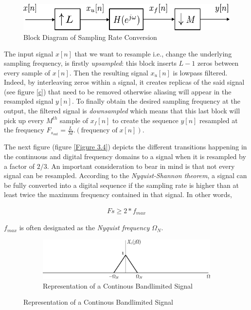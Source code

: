 \begin{figure}[th]
	\centering
	\includegraphics[scale = 0.8]{resampler.pdf}
	\caption{Block Diagram of Sampling Rate Conversion}\label{Figure 3.3}
\end{figure}

The input signal $x[n]$ that we want to resample i.e., change the underlying sampling frequency, is firstly \textit{upsampled}: this block inserts $L-1$ zeros between every sample of $x[n]$. Then the resulting signal $x_u[n]$ is lowpass filtered. Indeed, by interleaving zeros within a signal, it creates replicas of the said signal (see figure \ref{c}) that need to be removed otherwise aliasing will appear in the resampled signal $y[n]$. To finally obtain the desired sampling frequency at the output, the filtered signal is \textit{downsampled} which means that this last block will pick up every $M^{th}$ sample of $x_f[n]$  to create the sequence $y[n]$ resampled at the frequency $F_{s_{out}} = \frac{L}{M}.(\text{frequency of}\; x[n])$.

The next figure (figure \ref{Figure 3.4}) depicts the different transitions happening in the continuous and digital frequency domains to a signal when it is resampled by a factor of $2/3$. An important consideration to bear in mind is that not every signal can be resampled. According to the \textit{Nyquist-Shannon theorem}, a signal can be fully converted into a digital sequence if the sampling rate is higher than at least twice the maximum frequency contained in that signal. In other words, 

\begin{align}
	Fs \geqslant 2*f_{max} \label{eqn:Shannon}
\end{align}

$f_{max}$ is often designated as the \textit{Nyquist frequency} $\Omega_N$.

\vspace{1 cm}

\begin{figure}[htb!]
		\centering
		\begin{subfigure}[b]{\textwidth}
			\centering
			\includegraphics[scale=1]{DTFT_resampler_a.pdf}
			\caption{Representation of a Continous Bandlimited Signal}
		\end{subfigure}
	
	
	
\end{figure}
	
